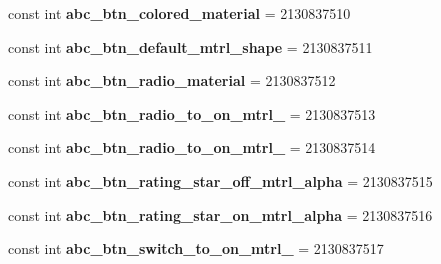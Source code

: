 \begin{DoxyCompactItemize}
\item 
\hypertarget{classClient_1_1Droid_1_1Resource_1_1Drawable_aab4386830384a84dd5cf642534ffae50}{}const int {\bfseries abc\+\_\+btn\+\_\+colored\+\_\+material} = 2130837510\label{classClient_1_1Droid_1_1Resource_1_1Drawable_aab4386830384a84dd5cf642534ffae50}

\item 
\hypertarget{classClient_1_1Droid_1_1Resource_1_1Drawable_a4e6df0adf0cf07ee2d33d460f476a12a}{}const int {\bfseries abc\+\_\+btn\+\_\+default\+\_\+mtrl\+\_\+shape} = 2130837511\label{classClient_1_1Droid_1_1Resource_1_1Drawable_a4e6df0adf0cf07ee2d33d460f476a12a}

\item 
\hypertarget{classClient_1_1Droid_1_1Resource_1_1Drawable_acf05fa9da0e5ab7fca961e716420d598}{}const int {\bfseries abc\+\_\+btn\+\_\+radio\+\_\+material} = 2130837512\label{classClient_1_1Droid_1_1Resource_1_1Drawable_acf05fa9da0e5ab7fca961e716420d598}

\item 
\hypertarget{classClient_1_1Droid_1_1Resource_1_1Drawable_a7ba95ffd0dd4e1a3d55aab692aa0200d}{}const int {\bfseries abc\+\_\+btn\+\_\+radio\+\_\+to\+\_\+on\+\_\+mtrl\+\_} = 2130837513\label{classClient_1_1Droid_1_1Resource_1_1Drawable_a7ba95ffd0dd4e1a3d55aab692aa0200d}

\item 
\hypertarget{classClient_1_1Droid_1_1Resource_1_1Drawable_a9658a9328b4c395b27537a07aa065aa2}{}const int {\bfseries abc\+\_\+btn\+\_\+radio\+\_\+to\+\_\+on\+\_\+mtrl\+\_} = 2130837514\label{classClient_1_1Droid_1_1Resource_1_1Drawable_a9658a9328b4c395b27537a07aa065aa2}

\item 
\hypertarget{classClient_1_1Droid_1_1Resource_1_1Drawable_a9067efd39bee45f4952aecb6110eb070}{}const int {\bfseries abc\+\_\+btn\+\_\+rating\+\_\+star\+\_\+off\+\_\+mtrl\+\_\+alpha} = 2130837515\label{classClient_1_1Droid_1_1Resource_1_1Drawable_a9067efd39bee45f4952aecb6110eb070}

\item 
\hypertarget{classClient_1_1Droid_1_1Resource_1_1Drawable_a7ba955d0b087bd23404711c573ac114c}{}const int {\bfseries abc\+\_\+btn\+\_\+rating\+\_\+star\+\_\+on\+\_\+mtrl\+\_\+alpha} = 2130837516\label{classClient_1_1Droid_1_1Resource_1_1Drawable_a7ba955d0b087bd23404711c573ac114c}

\item 
\hypertarget{classClient_1_1Droid_1_1Resource_1_1Drawable_ae22fe61826785e69b78f8bd893234d58}{}const int {\bfseries abc\+\_\+btn\+\_\+switch\+\_\+to\+\_\+on\+\_\+mtrl\+\_} = 2130837517\label{classClient_1_1Droid_1_1Resource_1_1Drawable_ae22fe61826785e69b78f8bd893234d58}


\end{DoxyCompactItemize}
